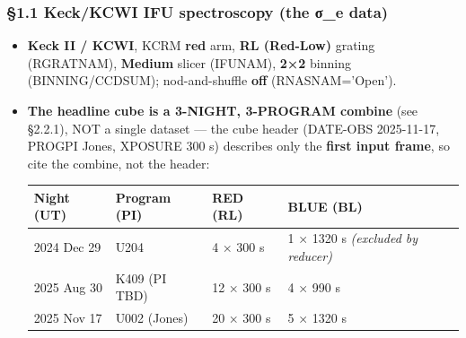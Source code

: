 \documentclass[
]{article}
\newcommand{\BreakablePath}[1]{{\ttfamily\sloppy #1}}
\begin{document}
\hypertarget{keckkcwi-ifu-spectroscopy-the-ux3c3_e-data}{%
\subsubsection{§1.1 Keck/KCWI IFU spectroscopy (the σ\_e
data)}\label{keckkcwi-ifu-spectroscopy-the-ux3c3_e-data}}

\begin{itemize}
\item
  \textbf{Keck II / KCWI}, KCRM \textbf{red} arm, \textbf{RL (Red-Low)}
  grating (\BreakablePath{RGRATNAM}), \textbf{Medium} slicer
  (\BreakablePath{IFUNAM}), \textbf{2×2} binning
  (\BreakablePath{BINNING}/\BreakablePath{CCDSUM}); nod-and-shuffle
  \textbf{off} (\BreakablePath{RNASNAM='Open'}).
\item
  \textbf{The headline cube is a 3-NIGHT, 3-PROGRAM combine} (see
  §2.2.1), NOT a single dataset --- the cube header
  (\BreakablePath{DATE-\discretionary{}{}{}OBS} 2025-11-17,
  \BreakablePath{PROGPI} Jones, \BreakablePath{XPOSURE} 300 s) describes
  only the \textbf{first input frame}, so cite the combine, not the
  header:

  \begin{longtable}[]{@{}llll@{}}
  \toprule
  Night (UT) & Program (PI) & RED (RL) & BLUE (BL) \\
  \midrule
  \endhead
  2024 Dec 29 & U204 & 4 × 300 s & 1 × 1320 s \emph{(excluded by
  reducer)} \\
  2025 Aug 30 & K409 (PI TBD) & 12 × 300 s & 4 × 990 s \\
  2025 Nov 17 & U002 (Jones) & 20 × 300 s & 5 × 1320 s \\
  \bottomrule
  \end{longtable}


\end{itemize}
\end{document}
